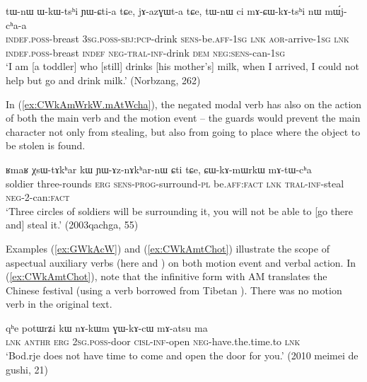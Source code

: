 \begin{exe}
\ex \label{ex:mACWkAtshi}
\gll  tɯ-nɯ ɯ-kɯ-tsʰi ɲɯ-ɕti-a tɕe, jɤ-azɣɯt-a tɕe, tɯ-nɯ ci mɤ-ɕɯ-kɤ-tsʰi nɯ mɯ́j-cʰa-a \\
\textsc{indef}.\textsc{poss}-breast \textsc{3sg}.\textsc{poss}-\textsc{sbj}:\textsc{pcp}-drink \textsc{sens}-be.\textsc{aff}-\textsc{1sg} \textsc{lnk} \textsc{aor}-arrive-\textsc{1sg} \textsc{lnk} \textsc{indef}.\textsc{poss}-breast  \textsc{indef} \textsc{neg}-\textsc{tral}-\textsc{inf}-drink \textsc{dem} \textsc{neg}:\textsc{sens}-can-\textsc{1sg} \\
\glt `I am [a toddler] who [still] drinks [his mother's] milk, when I arrived, I could not help but go and drink milk.'  (Norbzang, 262)
 \end{exe}
 
 In (\ref{ex:CWkAmWrkW.mAtWcha}), the negated modal verb has also on the action of both the main verb and the motion event -- the guards would prevent the main character not only from stealing, but also from going to place where the object to be stolen is found. 
 
\begin{exe}
\ex \label{ex:CWkAmWrkW.mAtWcha}
\gll ʁmaʁ χsɯ-tɤkʰar kɯ ɲɯ-ɤz-nɤkʰar-nɯ ɕti tɕe, ɕɯ-kɤ-mɯrkɯ mɤ-tɯ-cʰa  \\
soldier three-rounds \textsc{erg} \textsc{sens}-\textsc{prog}-surround-\textsc{pl} be.\textsc{aff}:\textsc{fact} \textsc{lnk}  \textsc{tral}-\textsc{inf}-steal \textsc{neg}-2-can:\textsc{fact} \\
\glt `Three circles of soldiers will be surrounding it, you will not be able to [go there and] steal it.' (2003qachga, 55)
   \end{exe}
   
 Examples (\ref{ex:GWkAcW}) and (\ref{ex:CWkAmtChot}) illustrate the scope of aspectual  auxiliary verbs (here   and ) on both motion event and verbal action.  In (\ref{ex:CWkAmtChot}), note that the infinitive form with AM   translates the Chinese festival  (using a verb borrowed from Tibetan  ). There was no motion verb in the original text.
 
\begin{exe}
\ex \label{ex:GWkAcW}
\gll qʰe potɯrʑi kɯ nɤ-kɯm ɣɯ-kɤ-cɯ mɤ-atsu ma \\
\textsc{lnk}  \textsc{anthr} \textsc{erg} \textsc{2sg}.\textsc{poss}-door \textsc{cisl}-\textsc{inf}-open \textsc{neg}-have.the.time.to \textsc{lnk} \\
\glt `Bod.rje does not have time to come and open the door for you.' (2010 meimei de gushi, 21)
\end{exe} 
  
